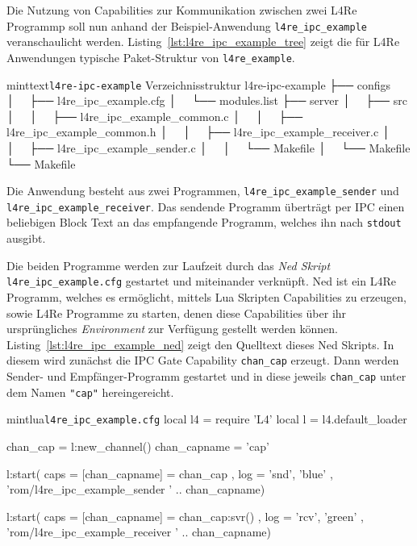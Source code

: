 Die Nutzung von Capabilities zur Kommunikation zwischen zwei L4Re Programmp
soll nun anhand der Beispiel-Anwendung \texttt{l4re\_ipc\_example}
veranschaulicht werden. Listing~\ref{lst:l4re_ipc_example_tree} zeigt die für
L4Re Anwendungen typische Paket-Struktur von \texttt{l4re\_example}.

\begin{mintlisting}[label=lst:l4re_ipc_example_tree]{minttext}{\texttt{l4re-ipc-example} Verzeichnisstruktur}
l4re-ipc-example
├── configs
│   ├── l4re_ipc_example.cfg
│   └── modules.list
├── server
│   ├── src
│   │   ├── l4re_ipc_example_common.c
│   │   ├── l4re_ipc_example_common.h
│   │   ├── l4re_ipc_example_receiver.c
│   │   ├── l4re_ipc_example_sender.c
│   │   └── Makefile
│   └── Makefile
└── Makefile
\end{mintlisting}

Die Anwendung besteht aus zwei Programmen, \texttt{l4re\_ipc\_example\_sender} und
\texttt{l4re\_ipc\_example\_receiver}. Das sendende Programm überträgt per IPC einen
beliebigen Block Text an das empfangende Programm, welches ihn nach
\texttt{stdout} ausgibt.

Die beiden Programme werden zur Laufzeit durch das \textit{Ned Skript}
\texttt{l4re\_ipc\_example.cfg} gestartet und miteinander verknüpft. Ned ist
ein L4Re Programm, welches es ermöglicht, mittels Lua Skripten Capabilities zu
erzeugen, sowie L4Re Programme zu starten, denen diese Capabilities über ihr
ursprüngliches \textit{Environment} zur Verfügung gestellt werden können.
Listing~\ref{lst:l4re_ipc_example_ned} zeigt den Quelltext dieses Ned Skripts.
In diesem wird zunächst die IPC Gate Capability \texttt{chan\_cap} erzeugt.
Dann werden Sender- und Empfänger-Programm gestartet und in diese jeweils
\texttt{chan\_cap} unter dem Namen \texttt{"cap"} hereingereicht.

\begin{mintlisting}[label=lst:l4re_ipc_example_ned]{mintlua}{\texttt{l4re\_ipc\_example.cfg}}
local l4 = require 'L4'
local l = l4.default_loader

chan_cap = l:new_channel()
chan_capname = 'cap'

l:start({ caps = { [chan_capname] = chan_cap },
          log = { 'snd', 'blue' } },
        'rom/l4re_ipc_example_sender ' .. chan_capname)

l:start({ caps = { [chan_capname] = chan_cap:svr() },
          log = { 'rcv', 'green' } },
        'rom/l4re_ipc_example_receiver ' .. chan_capname)
\end{mintlisting}

